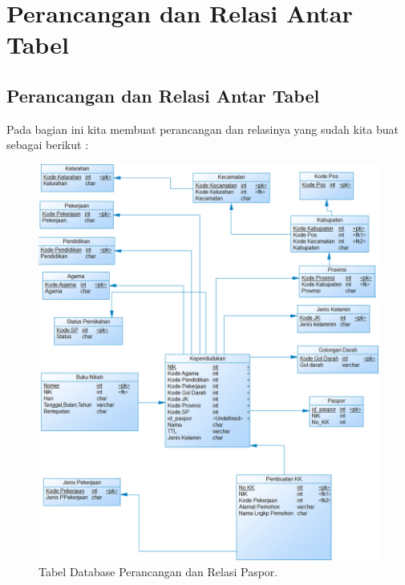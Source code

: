 \chapter{Perancangan dan Relasi Antar Tabel}

\section{Perancangan dan Relasi Antar Tabel}
Pada bagian ini kita membuat perancangan dan relasinya yang sudah kita buat sebagai berikut : 
\begin{figure}[H]
	\centering
	\includegraphics[width=12cm]{figures/relasipaspor.png}
	\caption{Tabel Database Perancangan dan Relasi Paspor.}
\end{figure}

